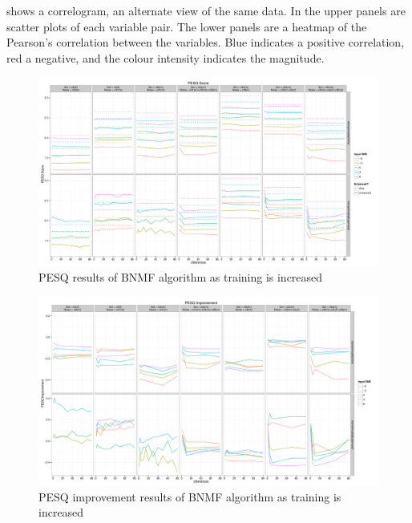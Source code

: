  shows a correlogram, an alternate view of
the same data. In the upper panels are scatter plots of each variable
pair. The lower panels are a heatmap of the Pearson's correlation
between the variables. Blue indicates a positive correlation, red
a negative, and the colour intensity indicates the magnitude.

\begin{figure}[p]
\noindent \begin{centering}
\includegraphics[angle=90,width=1\textwidth,height=0.95\textheight]{fig/R/train/pesq}
\par\end{centering}

\protect\caption{\label{fig:vary-train-pesq}\acs{PESQ} results of \acs{BNMF} algorithm
as training is increased}
\end{figure}


\begin{figure}[p]
\noindent \begin{centering}
\includegraphics[angle=90,width=1\textwidth,height=0.95\textheight]{fig/R/train/pesqImp}
\par\end{centering}

\protect\caption{\label{fig:vary-train-pesq-imp}\acs{PESQ} improvement results of
\acs{BNMF} algorithm as training is increased}
\end{figure}


